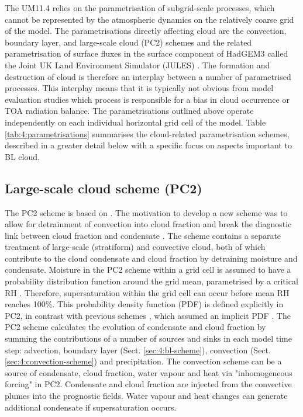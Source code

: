 The UM11.4 relies on the parametrisation of subgrid-scale
processes,
which cannot be represented by the atmospheric dynamics on the relatively
coarse grid of the model. The parametrisations directly affecting cloud
are the convection, boundary layer, and large-scale cloud (PC2) schemes
and the related parametrisation of surface fluxes in the surface component of
HadGEM3 called the Joint UK Land Environment Simulator (JULES) \citep{best2011,clark2011}. The formation
and destruction of cloud is therefore an interplay between a number
of parametrised processes. This interplay means that it is typically not obvious from model
evaluation studies which process is responsible for a bias in cloud occurrence
or TOA radiation balance. The parametrisations outlined above operate independently
on each individual horizontal grid cell of the model.
Table \ref{tab:4:parametrisations} summarises the cloud-related
parametrisation schemes, described in a greater detail below with a specific
focus on aspects important to BL cloud.

\subsection{Large-scale cloud scheme (PC2)}

The PC2 scheme is based on \cite{tiedtke1993}. The motivation to
develop a new scheme was to allow for detrainment of convection into cloud
fraction and break the diagnostic link between cloud fraction and condensate
\citep{umdp030}. The scheme contains a separate treatment of large-scale (stratiform) and
convective cloud, both of which contribute to the cloud condensate and cloud
fraction by detraining moisture and condensate. Moisture in the PC2 scheme
within a grid cell is assumed to have a probability distribution function around
the grid mean, parametrised by a critical RH \citep{gregory2002}.
Therefore, supersaturation within the grid cell can occur before mean
RH reaches 100\%. This probability density function (PDF) is defined explicitly in PC2, in
contrast with previous schemes \citep{tiedtke1993}, which assumed an implicit
PDF \citep{wilson2008a}.
The PC2 scheme calculates the evolution of condensate and cloud fraction by summing the
contributions of a number of sources and sinks in each model time step:
advection,  boundary layer (Sect. \ref{sec:4:bl-scheme}),
convection (Sect. \ref{sec:4:convection-scheme}) and precipitation.
The convection scheme can be a
source of condensate, cloud fraction, water vapour and heat via "inhomogeneous
forcing" in PC2. Condensate and cloud fraction are injected from the convective
plumes into the prognostic fields. Water vapour and heat changes can generate additional
condensate if supersaturation occurs.

